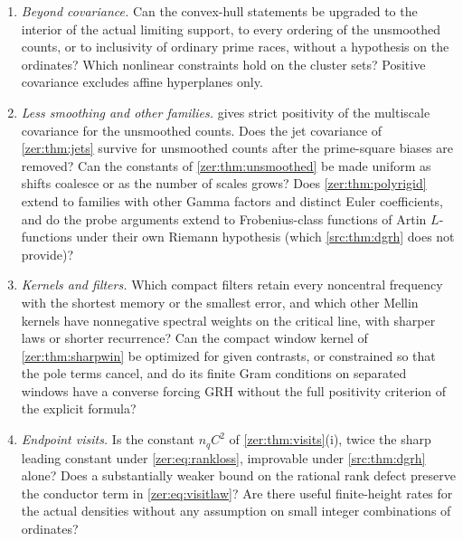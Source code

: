 \begin{enumerate}
tails are tracked? Does two-shape recovery persist for six or more equally spaced observations? Which small-divisor conditions on
symbols with arbitrarily small values suffice for the exact mesh characterization, and what condition is
necessary and sufficient for asynchronously sampled families whose individual meshes have gaps while the
set $\mathcal E$ of \cref{zer:thm:bankmesh} has none? For $\zeta$ itself, can arithmetic constraints on
multiple zeros beyond \cref{zer:lem:localM2} exclude a nonconstant tangent density in
\cref{zer:thm:missingfreq}, or the pulses of \cref{zer:thm:mesh}? That would remove the exceptional shapes
from \cref{zer:thm:coalesceinverse}(i).
\item \emph{Beyond covariance.} Can the convex-hull statements be upgraded to the interior of the
actual limiting support, to every ordering of the unsmoothed counts, or to inclusivity of
ordinary prime races, without a hypothesis on the ordinates? Which nonlinear constraints hold on
the cluster sets? Positive covariance excludes affine hyperplanes only.
\item \emph{Less smoothing and other families.}  gives strict positivity
of the multiscale covariance for the unsmoothed counts. Does the jet covariance of
\cref{zer:thm:jets} survive for unsmoothed counts after the prime-square biases are removed? Can the constants of \cref{zer:thm:unsmoothed} be made uniform as shifts coalesce or as the
number of scales grows? Does \cref{zer:thm:polyrigid} extend to families with
other Gamma factors and distinct Euler coefficients, and do the probe arguments extend to
Frobenius-class functions of Artin $L$-functions under their own Riemann hypothesis (which
\cref{src:thm:dgrh} does not provide)?
\item \emph{Kernels and filters.} Which compact filters retain every noncentral frequency with the
shortest memory or the smallest error, and which other Mellin kernels have nonnegative spectral
weights on the critical line, with sharper laws or shorter recurrence? Can the compact window
kernel of \cref{zer:thm:sharpwin} be optimized for given contrasts, or constrained so that the pole
terms cancel, and do its finite Gram conditions on separated windows have a converse forcing GRH
without the full positivity criterion of the explicit formula?
\item \emph{Endpoint visits.} Is the constant $n_qC^2$ of \cref{zer:thm:visits}(i), twice the sharp
leading constant under \eqref{zer:eq:rankloss}, improvable under \cref{src:thm:dgrh} alone? Does a
substantially weaker bound on the rational rank defect preserve the conductor term in
\eqref{zer:eq:visitlaw}? Are there useful finite-height rates for the actual densities without any
assumption on small integer combinations of ordinates?
\end{enumerate}

